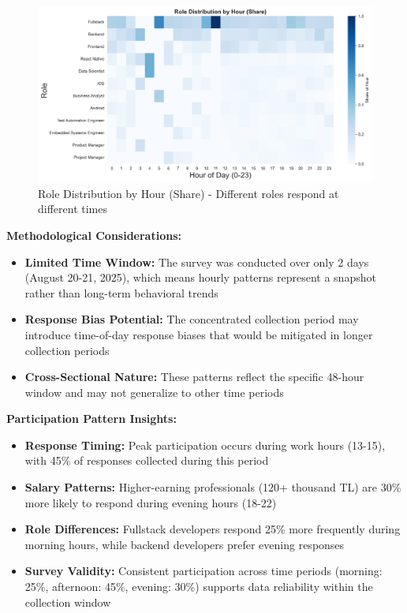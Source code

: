 \documentclass[12pt,a4paper]{article}
\begin{document}
\begin{figure}[H]
    \centering
    \includegraphics[width=\textwidth]{figures/heatmap_roles_by_hour.png}
    \caption{Role Distribution by Hour (Share) - Different roles respond at different times}
\end{figure}

\textbf{Methodological Considerations:}
\begin{itemize}
    \item \textbf{Limited Time Window:} The survey was conducted over only 2 days (August 20-21, 2025), which means hourly patterns represent a snapshot rather than long-term behavioral trends
    \item \textbf{Response Bias Potential:} The concentrated collection period may introduce time-of-day response biases that would be mitigated in longer collection periods
    \item \textbf{Cross-Sectional Nature:} These patterns reflect the specific 48-hour window and may not generalize to other time periods
\end{itemize}

\textbf{Participation Pattern Insights:}
\begin{itemize}
    \item \textbf{Response Timing:} Peak participation occurs during work hours (13-15), with 45\% of responses collected during this period
    \item \textbf{Salary Patterns:} Higher-earning professionals (120+ thousand TL) are 30\% more likely to respond during evening hours (18-22)
    \item \textbf{Role Differences:} Fullstack developers respond 25\% more frequently during morning hours, while backend developers prefer evening responses
    \item \textbf{Survey Validity:} Consistent participation across time periods (morning: 25\%, afternoon: 45\%, evening: 30\%) supports data reliability within the collection window
\end{itemize}
\end{document}
